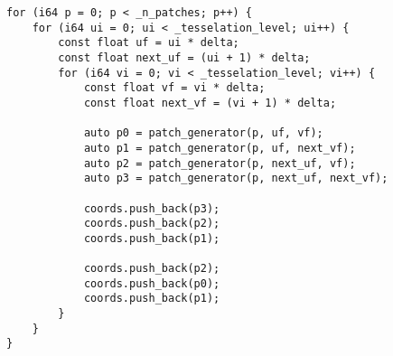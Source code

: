 \begin{lstlisting}
for (i64 p = 0; p < _n_patches; p++) {
    for (i64 ui = 0; ui < _tesselation_level; ui++) {
        const float uf = ui * delta;
        const float next_uf = (ui + 1) * delta;
        for (i64 vi = 0; vi < _tesselation_level; vi++) {
            const float vf = vi * delta;
            const float next_vf = (vi + 1) * delta;

            auto p0 = patch_generator(p, uf, vf);
            auto p1 = patch_generator(p, uf, next_vf);
            auto p2 = patch_generator(p, next_uf, vf);
            auto p3 = patch_generator(p, next_uf, next_vf);

            coords.push_back(p3);
            coords.push_back(p2);
            coords.push_back(p1);

            coords.push_back(p2);
            coords.push_back(p0);
            coords.push_back(p1);
        }
    }
}
\end{lstlisting}
